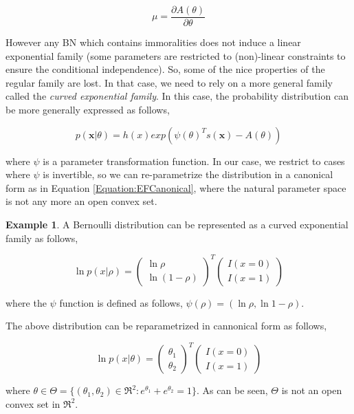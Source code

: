 \documentclass[11pt, oneside]{article}   	%
\newcommand{\bm}{\mathbf}
\numberwithin{figure}{section}
\numberwithin{equation}{section}
\numberwithin{table}{section}
\theoremstyle{definition}
\newtheorem{exmp}{Example}[section]
\begin{document}
\begin{equation}
\label{Equation:RegularEFEquality}
\mu = \frac{\partial A(\theta)}{\partial \theta}
\end{equation}


However any BN which contains immoralities does not induce a linear exponential family (some parameters are restricted to (non)-linear constraints to ensure the conditional independence). So, some of the nice properties of the regular family are lost. In that case, we need to rely on a more general family called the \textit{curved exponential family}. In this case, the probability distribution can be more generally expressed as follows, 

\begin{equation*}
p(\bm x |\theta) = h(x) exp(\psi(\theta)^Ts(\bm x) -
A(\theta) )
\end{equation*}

\noindent where $\psi$ is a parameter transformation function. In our case, we restrict to cases where $\psi$ is invertible, so we can re-parametrize the distribution in a canonical form as in Equation \ref{Equation:EFCanonical}, where the natural parameter space is not any more an open convex set.


\begin{exmp}

A Bernoulli distribution can be represented as a curved exponential family as follows, 


$$
\ln p(x| \rho ) = 
\begin{pmatrix}
\ln \rho\\
\ln (1-\rho)
\end{pmatrix}^T
\begin{pmatrix}
I(x=0)\\
I(x=1)
\end{pmatrix}
$$

\noindent where the $\psi$ function is defined as follows, $\psi(\rho) = (\ln \rho, \ln 1-\rho)$. 

The above distribution can be reparametrized in cannonical form as follows, 

$$
\ln p(x| \theta ) = 
\begin{pmatrix}
\theta_1\\
\theta_2
\end{pmatrix}^T
\begin{pmatrix}
I(x=0)\\
I(x=1)
\end{pmatrix}
$$

\noindent where $\theta\in\Theta = \{ (\theta_1, \theta_2) \in \Re^2 : e^{\theta_1} + e^{\theta_2} = 1\}$.  As can be seen, $\Theta$ is not an open convex set in $\Re^2$. 

\end{exmp}
\end{document}
